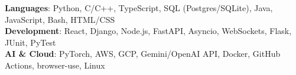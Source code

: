 \begin{itemize}[leftmargin=0.15in, label={}]
   \small{\item{
    \textbf{Languages}{: Python, C/C++, TypeScript, SQL (Postgres/SQLite), Java, JavaScript, Bash, HTML/CSS} \\
    \textbf{Development}{: React, Django, Node.js, FastAPI, Asyncio, WebSockets, Flask, JUnit, PyTest} \\
    \textbf{AI \& Cloud}{: PyTorch, AWS, GCP, Gemini/OpenAI API, Docker, GitHub Actions, browser-use, Linux}
   }}
\end{itemize}